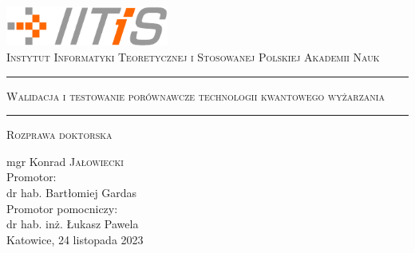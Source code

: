 \documentclass[11pt,dvipsnames,twoside,openright]{memoir}
\theoremstyle{definition}
\begin{document}
\begin{titlingpage}
  \begin{center}
    \includegraphics[width=0.4\textwidth]{figures/iitis_logo}\\
    \vspace{0.5em}
    \textsc{\large Instytut Informatyki Teoretycznej i Stosowanej Polskiej Akademii Nauk}
    \vspace*{1in}
    \hrule
    \vspace*{0.5em}
    \textsc{\huge Walidacja i testowanie porównawcze technologii kwantowego wyżarzania}
    \vspace*{0.5em}
    \hrule
    \vspace*{1em}
    \textsc{\large Rozprawa doktorska}
    \par
    \vspace{1.5in}
    {\large mgr Konrad \textsc{Jałowiecki}}\\
    \vspace{0.25in}
    Promotor:\\ dr hab. Bartłomiej Gardas\\
    \vspace{0.25in}
    Promotor pomocniczy:\\ dr hab. inż. Łukasz Pawela\\
    \vfill
    {Katowice, 24 listopada 2023}
  \end{center}
\end{titlingpage}

\frontmatter

\tableofcontents*
\newpage





\mainmatter










{
  \small
  \printbibliography
}
\appendix

\end{document}
